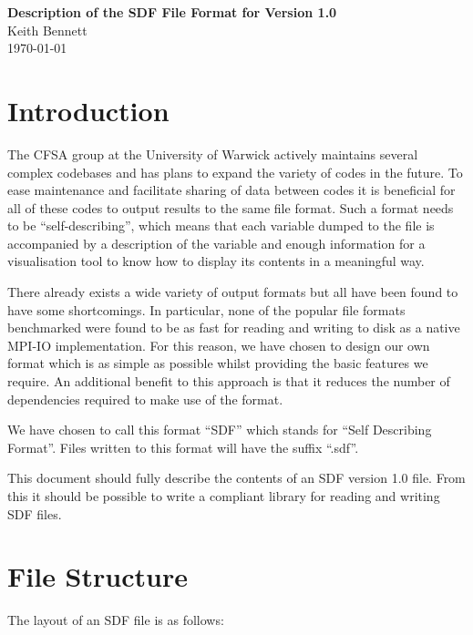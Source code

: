 \documentclass[12pt]{article}
\newcommand{\ver}{1}
\newcommand{\rev}{0}
\newcommand{\version}{{{\ver}.{\rev}}}
\begin{document}
\begin{center}
{\huge\bfseries Description of the SDF File Format for
  Version {\version}}\\[0.4cm]
{\Large Keith Bennett}\\[0.1cm]
{\large\today}\\[0.4cm]
\end{center}


\section{Introduction}
The CFSA group at the University of Warwick actively maintains several
complex codebases and has plans to expand the variety of codes in the future.
To ease maintenance and facilitate sharing of data between codes it is
beneficial for all of these codes to output results to the same file format.
Such a format needs to be ``self-describing'', which means that each variable
dumped to the file is accompanied by a description of the variable and enough
information for a visualisation tool to know how to display its contents in a
meaningful way.

There already exists a wide variety of output formats but all have been found
to have some shortcomings. In particular, none of the popular file formats
benchmarked were found to be as fast for reading and writing to disk as
a native MPI-IO implementation. For this reason, we have chosen to design our
own format which is as simple as possible whilst providing the basic features
we require. An additional benefit to this approach is that it reduces the
number of dependencies required to make use of the format.

We have chosen to call this format ``SDF'' which stands for ``Self Describing
Format''. Files written to this format will have the suffix ``.sdf''.

This document should fully describe the contents of an SDF version {\version}
file. From this it should be possible to write a compliant library for
reading and writing SDF files.

\section{File Structure}

The layout of an SDF file is as follows:\\
\end{document}
